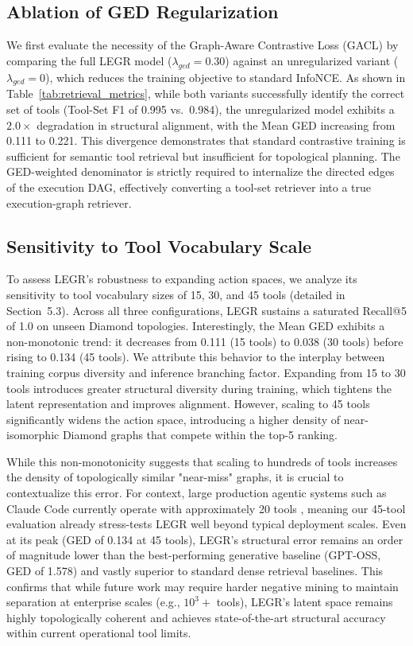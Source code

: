 \documentclass{article}
\begin{document}
\subsection{Ablation of GED Regularization}
We first evaluate the necessity of the Graph-Aware Contrastive Loss (GACL) by comparing the full LEGR model ($\lambda_{ged}=0.30$) against an unregularized variant ($\lambda_{ged}=0$), which reduces the training objective to standard InfoNCE. As shown in Table~\ref{tab:retrieval_metrics}, while both variants successfully identify the correct set of tools (Tool-Set F1 of 0.995 vs.\ 0.984), the unregularized model exhibits a $2.0\times$ degradation in structural alignment, with the Mean GED increasing from 0.111 to 0.221. This divergence demonstrates that standard contrastive training is sufficient for semantic tool retrieval but insufficient for topological planning. The GED-weighted denominator is strictly required to internalize the directed edges of the execution DAG, effectively converting a tool-set retriever into a true execution-graph retriever.

\subsection{Sensitivity to Tool Vocabulary Scale}
To assess LEGR's robustness to expanding action spaces, we analyze its sensitivity to tool vocabulary sizes of 15, 30, and 45 tools (detailed in Section~5.3). Across all three configurations, LEGR sustains a saturated Recall@5 of 1.0 on unseen Diamond topologies. Interestingly, the Mean GED exhibits a non-monotonic trend: it decreases from 0.111 (15 tools) to 0.038 (30 tools) before rising to 0.134 (45 tools). We attribute this behavior to the interplay between training corpus diversity and inference branching factor. Expanding from 15 to 30 tools introduces greater structural diversity during training, which tightens the latent representation and improves alignment. However, scaling to 45 tools significantly widens the action space, introducing a higher density of near-isomorphic Diamond graphs that compete within the top-5 ranking. 

While this non-monotonicity suggests that scaling to hundreds of tools increases the density of topologically similar "near-miss" graphs, it is crucial to contextualize this error. For context, large production agentic systems such as Claude Code currently operate with approximately 20 tools \cite{claude_code_tools}, meaning our 45-tool evaluation already stress-tests LEGR well beyond typical deployment scales. Even at its peak (GED of 0.134 at 45 tools), LEGR's structural error remains an order of magnitude lower than the best-performing generative baseline (GPT-OSS, GED of 1.578) and vastly superior to standard dense retrieval baselines. This confirms that while future work may require harder negative mining to maintain separation at enterprise scales (e.g., $10^3+$ tools), LEGR's latent space remains highly topologically coherent and achieves state-of-the-art structural accuracy within current operational tool limits.
\end{document}
